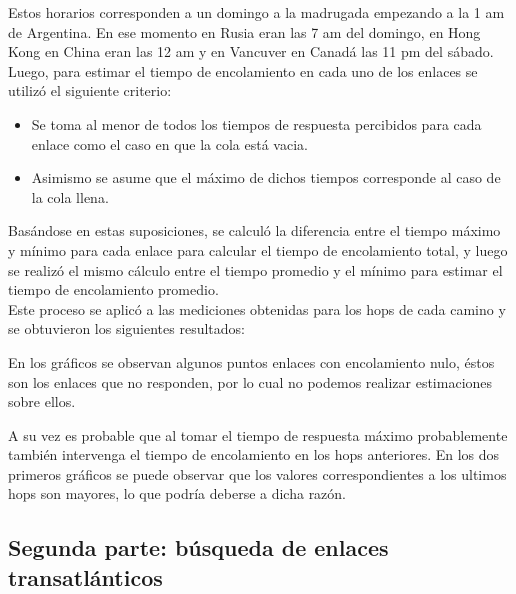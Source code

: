 
Estos horarios corresponden a un domingo a la madrugada empezando a la 1 am de Argentina. En ese momento en Rusia eran las 7 am del domingo, en Hong Kong en China eran las 12 am y en Vancuver en Canad\'a las 11 pm del s\'abado. \\

Luego, para estimar el tiempo de encolamiento en cada uno de los enlaces se utilizó el siguiente criterio:
\begin{itemize}
\item Se toma al menor de todos los tiempos de respuesta percibidos para cada enlace como el caso en que la cola está vacia.
\item Asimismo se asume que el máximo de dichos tiempos corresponde al caso de la cola llena.
\end{itemize}
Basándose en estas suposiciones, se calculó la diferencia entre el tiempo máximo y mínimo para cada enlace para calcular el tiempo de encolamiento total, y luego se realizó el mismo
cálculo entre el tiempo promedio y el mínimo para estimar el tiempo de encolamiento promedio. \\

Este proceso se aplicó a las mediciones obtenidas para los hops de cada camino y se obtuvieron los siguientes resultados:


En los gráficos se observan algunos puntos enlaces con encolamiento nulo, éstos son los enlaces que no responden, por lo cual no podemos realizar estimaciones sobre ellos.

A su vez es probable que al tomar el tiempo de respuesta máximo probablemente también intervenga el tiempo de encolamiento en los hops anteriores. En los dos primeros gráficos se
puede observar que los valores correspondientes a los ultimos hops son mayores, lo que podría deberse a dicha razón.

\subsection{Segunda parte: búsqueda de enlaces transatlánticos}

